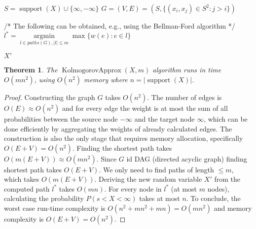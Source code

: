 \documentclass{article}
\newtheorem{theorem}[thm]{Theorem}
\DeclareMathOperator{\support}{support}
\DeclareMathOperator{\KlmApprox}{KolmogorovApprox}
\begin{document}
\begin{algorithm}\label{alg:optapprox}
	\DontPrintSemicolon
	$S = \support(X)\cup \{\infty,-\infty\}$\;
	$G=(V,E)=(S, \{ (x_i,x_j) \in S^2 \colon  j>i \})$ \;
	
	
	/* The following can be obtained, e.g., using the Bellman-Ford algorithm */\;
	$l^*= \operatorname{argmin}\limits_{l \in paths(G),|l|\leq m}  \max \{ w(e)\colon e \in l  \}$ \;
	
	\Return $X'$\;
	
	\caption{$\KlmApprox (X, m)$}  
	\label{alg:sequence}
\end{algorithm}

\begin{theorem}\label{the:complexity}
	The $\KlmApprox(X,m)$ algorithm runs in time $O(mn^2)$, using $O(n^2)$ memory where $n=|\support(X)|$.
\end{theorem}

\begin{proof}
	Constructing the graph $G$ takes $O(n^2)$. The number of edges is $O(E)\approx O(n^2)$ and for every edge the weight is at most the sum of all probabilities between the source node $-\infty$ and the target node $\infty$, which can be done efficiently by aggregating the weights of already calculated edges. 
	The construction is also the only stage that requires memory allocation, specifically $O(E+V)=O(n^2)$.
	Finding the shortest path takes $O(m(E+V))\approx O(mn^2)$. Since $G$ id DAG (directed acyclic graph) finding shortest path takes $O(E+V)$. We only need to find paths of length $\leq m$, which takes $O(m(E+V))$.
	Deriving the new random variable $X'$ from the computed path $l^*$ takes $O(mn)$. For every node in $l^*$ (at most $m$ nodes), calculating the probability $P(s<X<\infty)$ takes at most $n$. 
	To conclude, the worst case run-time complexity is $O(n^2+mn^2+mn)=O(mn^2)$ and memory complexity is $O(E+V)=O(n^2)$.
\end{proof}
\end{document}
